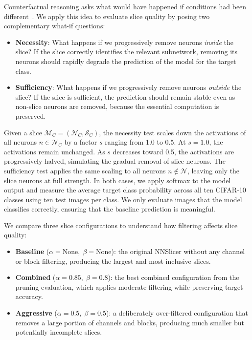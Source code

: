 \documentclass[
12pt,
fancyheadings,
a4paper,
twoside,
BCOR=0.7cm,
nobcorignoretitle,
grayscalebody,
]{stsreprt}
\begin{document}
Counterfactual reasoning asks what would have happened if conditions had been
different~\cite{pearl2009causality}.
We apply this idea to evaluate slice quality by posing two complementary what-if questions:

\begin{itemize}
    \item \textbf{Necessity}: What happens if we progressively remove neurons \emph{inside} the slice? If the slice correctly identifies the relevant subnetwork, removing its neurons should rapidly degrade the prediction of the model for the target class.
    \item \textbf{Sufficiency}: What happens if we progressively remove neurons \emph{outside} the slice? If the slice is sufficient, the prediction should remain stable even as non-slice neurons are removed, because the essential computation is preserved.
\end{itemize}

Given a slice $\mathcal{M}_C = (\mathcal{N}_C, \mathcal{S}_C)$, the necessity test scales down the
activations of all neurons $n \in \mathcal{N}_C$ by a factor $s$ ranging from 1.0 to 0.5. At $s =
1.0$, the activations remain unchanged. As $s$ decreases toward 0.5, the activations are
progressively halved, simulating the gradual removal of slice neurons.
The sufficiency test applies the same scaling to all neurons $n \notin \mathcal{N}$, leaving only
the slice neurons at full strength.
In both cases, we apply softmax to the model output and measure the average target class
probability across all ten CIFAR-10 classes using ten test images per class.
We only evaluate images that the model classifies correctly, ensuring that the baseline prediction
is meaningful.

We compare three slice configurations to understand how filtering affects slice quality:

\begin{itemize}
    \item \textbf{Baseline} ($\alpha{=}\text{None},\;\beta{=}\text{None}$): the original NNSlicer without any channel or block filtering, producing the largest and most inclusive slices.
    \item \textbf{Combined} ($\alpha{=}0.85,\;\beta{=}0.8$): the best combined configuration from the pruning evaluation, which applies moderate filtering while preserving target accuracy.
    \item \textbf{Aggressive} ($\alpha{=}0.5,\;\beta{=}0.5$): a deliberately over-filtered configuration that removes a large portion of channels and blocks, producing much smaller but potentially incomplete slices.
\end{itemize}
\end{document}
